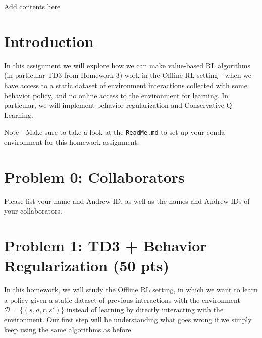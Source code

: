 \documentclass[12pt]{article}
\begin{document}

Add contents here

\newpage


\section*{Introduction}
In this assignment we will explore how we can make value-based RL algorithms (in particular TD3 from Homework 3) work in the Offline RL setting - when we have access to a static dataset of environment interactions collected with some behavior policy, and no online access to the environment for learning.  In particular, we will implement behavior regularization and Conservative Q-Learning.

Note - Make sure to take a look at the \texttt{ReadMe.md} to set up your conda environment for this homework assignment.

\section*{Problem 0: Collaborators}
Please list your name and Andrew ID, as well as the names and Andrew IDs of your collaborators.

\section*{Problem 1: TD3 + Behavior Regularization (50 pts)}

In this homework, we will study the Offline RL setting, in which we want to learn a policy given a static dataset of previous interactions with the environment $\mathcal{D} = \{(s, a, r, s')\}$ instead of learning by directly interacting with the environment. Our first step will be understanding what goes wrong if we simply keep using the same algorithms as before.
\end{document}
